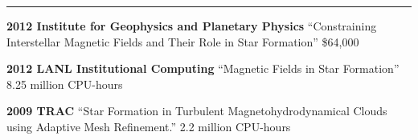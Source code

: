 
\vspace{0.3in}
\rule[3pt]{417pt}{.1mm}

\medskip
\noindent
{\bf 2012 Institute for Geophysics and Planetary Physics } ``Constraining Interstellar Magnetic Fields and Their Role in Star
Formation'' \$64,000

\medskip
\noindent 
{\bf 2012 LANL Institutional Computing} ``Magnetic Fields in Star Formation''
8.25 million CPU-hours

\medskip
\noindent 
{\bf 2009 TRAC} ``Star Formation in Turbulent Magnetohydrodynamical Clouds using
Adaptive Mesh Refinement.'' 2.2 million CPU-hours

